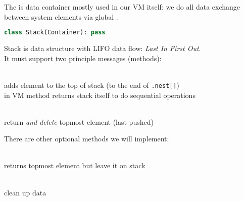 
The  is data container mostly used in our VM itself: we do all data
exchange between system elements via global .

\begin{lstlisting}[language=Python]
class Stack(Container): pass
\end{lstlisting}

\noindent
Stack is data structure with LIFO data flow: \emph{Last In First Out}.\\
It must support two principle messages (methods):
\begin{description}[nosep]
\item[push]\ \\adds element to the
top of stack (to the end of \verb|.nest[]|)\\
in VM method returns stack itself to do sequential operations
\item[pop]\ \\return \emph{and delete} topmost
element (last pushed)
\end{description}

\noindent
There are other optional methods we will implement:
\begin{description}[nosep]
\item[top]\ \\returns topmost element but leave it on
stack
\item[flush]\ \\clean up data
\end{description}
